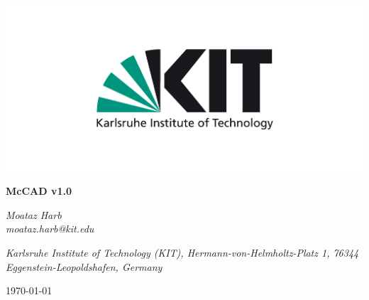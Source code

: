 \documentclass[12pt, a4paper, titlepage]{article}
\begin{document}
\begin{titlepage}
	\centering
	\includegraphics[scale=0.3]{figures/KIT-logo.png} \\
	\vspace{2cm}
	{\huge\bfseries McCAD v1.0\par}
	\vspace{1.5cm}
	{\Large\itshape Moataz Harb\\moataz.harb@kit.edu\par}
	\vspace{1cm}
	{\Large\itshape Karlsruhe Institute of Technology (KIT), Hermann-von-Helmholtz-Platz 1, 76344 Eggenstein-Leopoldshafen, Germany\par}
	\vfill
	{\large \today\par}
\end{titlepage}
\clearpage

\tableofcontents
\clearpage

\end{document}
